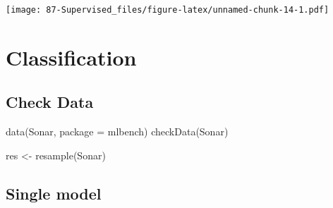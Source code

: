 \documentclass[
]{book}
\newenvironment{Shaded}{\begin{snugshade}}{\end{snugshade}}
\newcommand{\AttributeTok}[1]{\textcolor[rgb]{0.77,0.63,0.00}{#1}}
\newcommand{\FunctionTok}[1]{\textcolor[rgb]{0.00,0.00,0.00}{#1}}
\newcommand{\NormalTok}[1]{#1}
\newcommand{\OtherTok}[1]{\textcolor[rgb]{0.56,0.35,0.01}{#1}}
\newcommand{\SpecialCharTok}[1]{\textcolor[rgb]{0.00,0.00,0.00}{#1}}
\newcommand{\StringTok}[1]{\textcolor[rgb]{0.31,0.60,0.02}{#1}}
\begin{document}
\begin{Shaded}
\end{Shaded}

\texttt{[image: 87-Supervised\_files/figure-latex/unnamed-chunk-14-1.pdf]}

\hypertarget{classification}{%
\section{Classification}\label{classification}}

\hypertarget{check-data}{%
\subsection{Check Data}\label{check-data}}

\begin{Shaded}
\begin{Highlighting}[]
\FunctionTok{data}\NormalTok{(Sonar, }\AttributeTok{package =} \StringTok{\textquotesingle{}mlbench\textquotesingle{}}\NormalTok{)}
\FunctionTok{checkData}\NormalTok{(Sonar)}
\end{Highlighting}
\end{Shaded}

\begin{Shaded}
\begin{Highlighting}[]
\NormalTok{res }\OtherTok{\textless{}{-}} \FunctionTok{resample}\NormalTok{(Sonar)}
\end{Highlighting}
\end{Shaded}

\begin{Shaded}
\end{Shaded}

\hypertarget{single-model-1}{%
\subsection{Single model}\label{single-model-1}}
\end{document}
